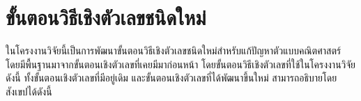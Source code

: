 \chapter{ขั้นตอนวิธีเชิงตัวเลขชนิดใหม่}
\hspace{1cm} ในโครงงานวิจัยนี้เป็นการพัฒนาขั้นตอนวิธีเชิงตัวเลขชนิดใหม่สำหรับแก้ปัญหาตัวแบบคณิตศาสตร์ โดยมีพื้นฐานมาจากขั้นตอนเชิงตัวเลขที่เคยมีมาก่อนหน้า โดยขั้นตอนวิธีเชิงตัวเลขที่ใช้ในโครงงานวิจัยดังนี้ ทั้งขั้นตอนเชิงตัวเลขที่มีอยู่เดิม และขั้นตอนเชิงตัวเลขที่ได้พัฒนาขึ้นใหม่ สามารถอธิบายโดยสังเขปได้ดังนี้






\clearpage